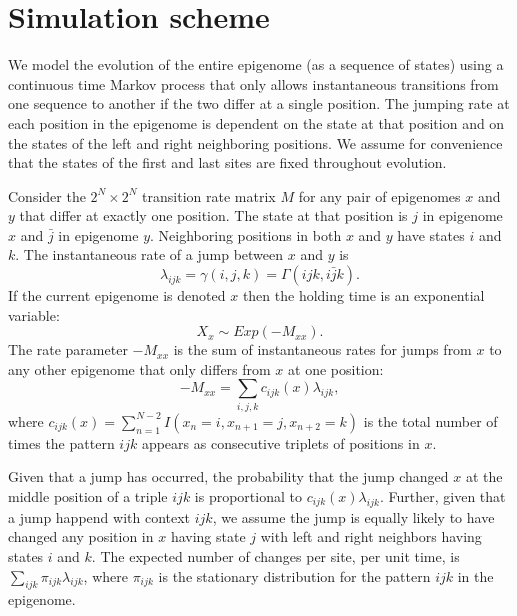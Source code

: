 \documentclass[11pt]{article}
\begin{document}
\section{Simulation scheme}


We model the evolution of the entire epigenome (as a sequence of
states) using a continuous time Markov process that only allows
instantaneous transitions from one sequence to another if the two
differ at a single position. The jumping rate at each position in the
epigenome is dependent on the state at that position and on the states
of the left and right neighboring positions. We assume for convenience
that the states of the first and last sites are fixed throughout
evolution.

Consider the $2^N \times 2^N$ transition rate matrix $M$ for any pair
of epigenomes $x$ and $y$ that differ at exactly one position. The
state at that position is $j$ in epigenome $x$ and $\bar{j}$ in
epigenome $y$. Neighboring positions in both $x$ and $y$ have states
$i$ and $k$. The instantaneous rate of a jump between $x$ and $y$
is
\[
\lambda_{ijk} = \gamma(i, j, k) = \Gamma(ijk, i\bar{j}k).
\]
If the current epigenome is denoted $x$ then the holding time
is an exponential variable:
\[
  X_x\sim \mathit{Exp}(-M_{xx}).
\]
The rate parameter $-M_{xx}$ is the sum of instantaneous rates for
jumps from $x$ to any other epigenome that only differs from $x$ at
one position:
\[
  -M_{xx} =  \sum\limits_{i,j,k}c_{ijk}(x)\lambda_{ijk},
\]
where $c_{ijk}(x) = \sum_{n=1}^{N-2}I(x_{n}=i, x_{n+1}=j, x_{n+2}=k)$
is the total number of times the pattern $ijk$ appears as consecutive
triplets of positions in $x$.

Given that a jump has occurred, the probability that the jump changed
$x$ at the middle position of a triple $ijk$ is proportional to
$c_{ijk}(x)\lambda_{ijk}$. Further, given that a jump happend with
context $ijk$, we assume the jump is equally likely to have changed
any position in $x$ having state $j$ with left and right neighbors
having states $i$ and $k$.
The expected number of changes per site, per unit time, is
$\sum_{ijk}\pi_{ijk}\lambda_{ijk}$, where $\pi_{ijk}$ is the
stationary distribution for the pattern $ijk$ in the epigenome.
\end{document}
